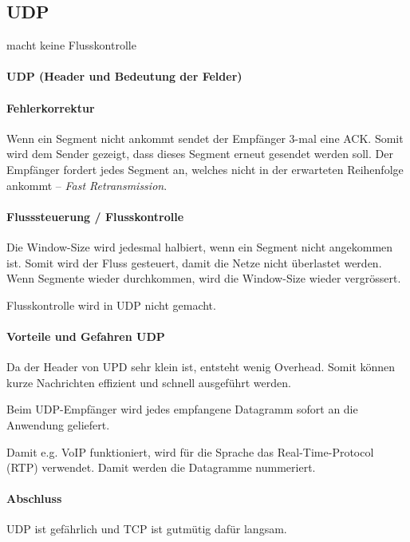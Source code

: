 \documentclass[a4paper,12pt]{article}
\begin{document}
\subsection{UDP}
macht keine Flusskontrolle
\paragraph{UDP (Header und Bedeutung der Felder)}







\paragraph{Fehlerkorrektur} Wenn ein Segment nicht ankommt sendet der Empfänger 3-mal eine ACK. Somit wird dem Sender gezeigt, dass dieses Segment erneut gesendet werden soll. Der Empfänger fordert jedes Segment an, welches nicht in der erwarteten Reihenfolge ankommt -- \emph{Fast Retransmission}.

\paragraph{Flusssteuerung / Flusskontrolle} Die Window-Size wird jedesmal halbiert, wenn ein Segment nicht angekommen ist. Somit wird der Fluss gesteuert, damit die Netze nicht überlastet werden. Wenn Segmente wieder durchkommen, wird die Window-Size wieder vergrössert.

Flusskontrolle wird in UDP nicht gemacht.

\paragraph{Vorteile und Gefahren UDP} Da der Header von UPD sehr klein ist, entsteht wenig Overhead. Somit können kurze Nachrichten effizient und schnell ausgeführt werden.

Beim UDP-Empfänger wird jedes empfangene Datagramm sofort an die Anwendung geliefert.


Damit e.g. VoIP funktioniert, wird für die Sprache das Real-Time-Protocol (RTP) verwendet. Damit werden die Datagramme nummeriert.


\paragraph{Abschluss}
UDP ist gefährlich und TCP ist gutmütig dafür langsam.
\end{document}
